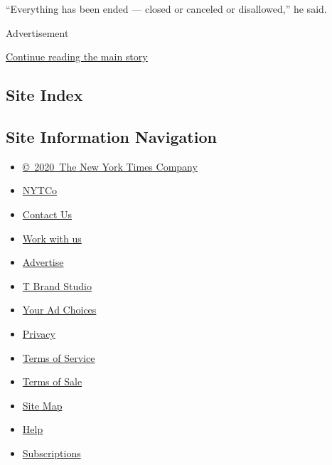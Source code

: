 ``Everything has been ended --- closed or canceled or disallowed,'' he
said.

Advertisement

\protect\hyperlink{after-bottom}{Continue reading the main story}

\hypertarget{site-index}{%
\subsection{Site Index}\label{site-index}}

\hypertarget{site-information-navigation}{%
\subsection{Site Information
Navigation}\label{site-information-navigation}}

\begin{itemize}
\tightlist
\item
  \href{https://help.nytimes.com/hc/en-us/articles/115014792127-Copyright-notice}{©~2020~The
  New York Times Company}
\end{itemize}

\begin{itemize}
\tightlist
\item
  \href{https://www.nytco.com/}{NYTCo}
\item
  \href{https://help.nytimes.com/hc/en-us/articles/115015385887-Contact-Us}{Contact
  Us}
\item
  \href{https://www.nytco.com/careers/}{Work with us}
\item
  \href{https://nytmediakit.com/}{Advertise}
\item
  \href{http://www.tbrandstudio.com/}{T Brand Studio}
\item
  \href{https://www.nytimes.com/privacy/cookie-policy\#how-do-i-manage-trackers}{Your
  Ad Choices}
\item
  \href{https://www.nytimes.com/privacy}{Privacy}
\item
  \href{https://help.nytimes.com/hc/en-us/articles/115014893428-Terms-of-service}{Terms
  of Service}
\item
  \href{https://help.nytimes.com/hc/en-us/articles/115014893968-Terms-of-sale}{Terms
  of Sale}
\item
  \href{https://spiderbites.nytimes.com}{Site Map}
\item
  \href{https://help.nytimes.com/hc/en-us}{Help}
\item
  \href{https://www.nytimes.com/subscription?campaignId=37WXW}{Subscriptions}
\end{itemize}
